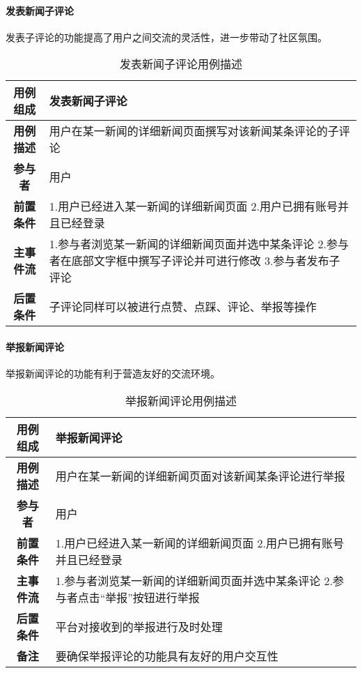 \paragraph{发表新闻子评论}

发表子评论的功能提高了用户之间交流的灵活性，进一步带动了社区氛围。\\

\begin{table}[H]
	\centering
	\caption{发表新闻子评论用例描述}
	\renewcommand\arraystretch{1.5}
	\begin{tabular}{|c|>{\raggedright\arraybackslash}p{10cm}|}
		\hline
		\textbf{用例组成} & \textbf{发表新闻子评论}\\
		\hline
		\textbf{用例描述} & 用户在某一新闻的详细新闻页面撰写对该新闻某条评论的子评论\\ 
		\hline
		\textbf{参与者} & 用户\\
		\hline
		\textbf{前置条件} & 
		1.用户已经进入某一新闻的详细新闻页面\newline
		2.用户已拥有账号并且已经登录\\
		\hline
		\textbf{主事件流} & 
		1.参与者浏览某一新闻的详细新闻页面并选中某条评论\newline
		2.参与者在底部文字框中撰写子评论并可进行修改\newline
		3.参与者发布子评论\\
		\hline
		\textbf{后置条件} & 子评论同样可以被进行点赞、点踩、评论、举报等操作\\
		\hline
	\end{tabular}
\end{table}

\paragraph{举报新闻评论}

举报新闻评论的功能有利于营造友好的交流环境。\\

\begin{table}[H]
	\centering
	\caption{举报新闻评论用例描述}
	\renewcommand\arraystretch{1.5}
	\begin{tabular}{|c|>{\raggedright\arraybackslash}p{10cm}|}
		\hline
		\textbf{用例组成} & \textbf{举报新闻评论}\\
		\hline
		\textbf{用例描述} & 用户在某一新闻的详细新闻页面对该新闻某条评论进行举报\\ 
		\hline
		\textbf{参与者} & 用户\\
		\hline
		\textbf{前置条件} & 
		1.用户已经进入某一新闻的详细新闻页面\newline
		2.用户已拥有账号并且已经登录\\
		\hline
		\textbf{主事件流} & 
		1.参与者浏览某一新闻的详细新闻页面并选中某条评论\newline
		2.参与者点击“举报”按钮进行举报\\
		\hline
		\textbf{后置条件} & 平台对接收到的举报进行及时处理\\
		\hline
		\textbf{备注} & 要确保举报评论的功能具有友好的用户交互性\\
		\hline
	\end{tabular}
\end{table}


